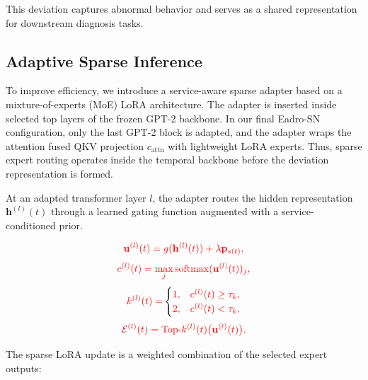 This deviation captures abnormal behavior and serves as a shared representation for downstream diagnosis tasks.
\subsection{Adaptive Sparse Inference}

To improve efficiency, we introduce a service-aware sparse adapter based on a mixture-of-experts (MoE) LoRA architecture. The adapter is inserted inside selected top layers of the frozen GPT-2 backbone. In our final Eadro-SN configuration, only the last GPT-2 block is adapted, and the adapter wraps the attention fused QKV projection \(c_{\mathrm{attn}}\) with lightweight LoRA experts. Thus, sparse expert routing operates inside the temporal backbone before the deviation representation is formed.

At an adapted transformer layer \(l\), the adapter routes the hidden representation \(\mathbf{h}^{(l)}(t)\) through a learned gating function augmented with a service-conditioned prior. 

\begin{equation}
\textcolor{red}{\mathbf{u}^{(l)}(t)=g(\mathbf{h}^{(l)}(t))+\lambda \mathbf{p}_{s(t)},}
\end{equation}
\begin{equation}
\textcolor{red}{c^{(l)}(t)=\max_j \mathrm{softmax}(\mathbf{u}^{(l)}(t))_j ,}
\end{equation}
\begin{equation}
\textcolor{red}{k^{(l)}(t)=}
\begin{cases}
\textcolor{red}{1,} & \textcolor{red}{c^{(l)}(t)\ge \tau_k,}\\
\textcolor{red}{2,} & \textcolor{red}{c^{(l)}(t)< \tau_k,}
\end{cases}
\end{equation}
\begin{equation}
\textcolor{red}{\mathcal{E}^{(l)}(t)=\mathrm{Top}\text{-}k^{(l)}(t)\bigl(\mathbf{u}^{(l)}(t)\bigr).}
\end{equation}


The sparse LoRA update is a weighted combination of the selected expert outputs:

